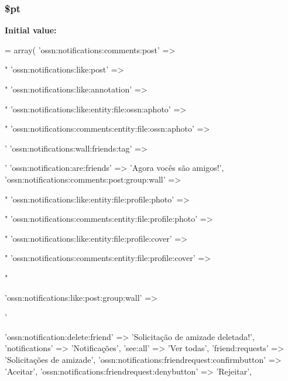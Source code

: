 \subsubsection[{\texorpdfstring{\$pt}{$pt}}]{\setlength{\rightskip}{0pt plus 5cm}\$pt}\hypertarget{components_2_ossn_notifications_2locale_2ossn_8pt_8php_a62c150775a7a00e8663463c638016cad}{}\label{components_2_ossn_notifications_2locale_2ossn_8pt_8php_a62c150775a7a00e8663463c638016cad}
{\bfseries Initial value\+:}
\begin{DoxyCode}
= array(
    \textcolor{stringliteral}{'ossn:notifications:comments:post'} => \textcolor{stringliteral}{"%
    \textcolor{stringliteral}{'ossn:notifications:like:post'} => \textcolor{stringliteral}{"%
    \textcolor{stringliteral}{'ossn:notifications:like:annotation'} => \textcolor{stringliteral}{"%
    \textcolor{stringliteral}{'ossn:notifications:like:entity:file:ossn:aphoto'} => \textcolor{stringliteral}{"%
    \textcolor{stringliteral}{'ossn:notifications:comments:entity:file:ossn:aphoto'} => \textcolor{stringliteral}{'%
    \textcolor{stringliteral}{'ossn:notifications:wall:friends:tag'} => \textcolor{stringliteral}{'%
    \textcolor{stringliteral}{'ossn:notification:are:friends'} => \textcolor{stringliteral}{'Agora vocês são amigos!'},
    \textcolor{stringliteral}{'ossn:notifications:comments:post:group:wall'} => \textcolor{stringliteral}{"%
    \textcolor{stringliteral}{'ossn:notifications:like:entity:file:profile:photo'} => \textcolor{stringliteral}{"%
    \textcolor{stringliteral}{'ossn:notifications:comments:entity:file:profile:photo'} => \textcolor{stringliteral}{"%
    \textcolor{stringliteral}{'ossn:notifications:like:entity:file:profile:cover'} => \textcolor{stringliteral}{"%
    \textcolor{stringliteral}{'ossn:notifications:comments:entity:file:profile:cover'} => \textcolor{stringliteral}{"%

    \textcolor{stringliteral}{'ossn:notifications:like:post:group:wall'} => \textcolor{stringliteral}{'%
    
    \textcolor{stringliteral}{'ossn:notification:delete:friend'} => \textcolor{stringliteral}{'Solicitação de amizade deletada!'},
    \textcolor{stringliteral}{'notifications'} => \textcolor{stringliteral}{'Notificações'},
    \textcolor{stringliteral}{'see:all'} => \textcolor{stringliteral}{'Ver todas'},
    \textcolor{stringliteral}{'friend:requests'} => \textcolor{stringliteral}{'Solicitações de amizade'},
    \textcolor{stringliteral}{'ossn:notifications:friendrequest:confirmbutton'} => \textcolor{stringliteral}{'Aceitar'},
    \textcolor{stringliteral}{'ossn:notifications:friendrequest:denybutton'} => \textcolor{stringliteral}{'Rejeitar'},
    
}}}}}}}}}}}}
\end{DoxyCode}
